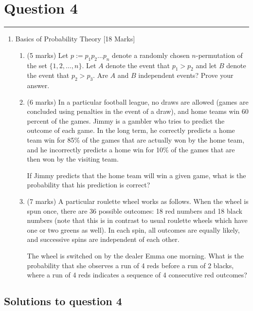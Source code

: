 \documentclass{article}
\begin{document}
\newpage
\section*{Question 4}
\hrule
\vspace{0.5cm}

\begin{enumerate}
    \item Basics of Probability Theory [18 Marks]
          \begin{enumerate}
              \item (5 marks) Let \( p := p_1 p_2 \dots p_n \) denote a randomly chosen \( n \)-permutation of the set \(\{1, 2, \dots, n\}\). Let \( A \) denote the event that \( p_1 > p_2 \) and let \( B \) denote the event that \( p_2 > p_3 \). Are \( A \) and \( B \) independent events? Prove your answer.

              \item (6 marks) In a particular football league, no draws are allowed (games are concluded using penalties in the event of a draw), and home teams win 60 percent of the games. Jimmy is a gambler who tries to predict the outcome of each game. In the long term, he correctly predicts a home team win for 85\% of the games that are actually won by the home team, and he incorrectly predicts a home win for 10\% of the games that are then won by the visiting team.

                    If Jimmy predicts that the home team will win a given game, what is the probability that his prediction is correct?

              \item (7 marks) A particular roulette wheel works as follows. When the wheel is spun once, there are 36 possible outcomes: 18 red numbers and 18 black numbers (note that this is in contrast to usual roulette wheels which have one or two greens as well). In each spin, all outcomes are equally likely, and successive spins are independent of each other.

                    The wheel is switched on by the dealer Emma one morning. What is the probability that she observes a run of 4 reds before a run of 2 blacks, where a run of 4 reds indicates a sequence of 4 consecutive red outcomes?
          \end{enumerate}
\end{enumerate}

\subsection*{Solutions to question 4}
\end{document}
